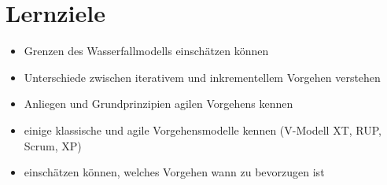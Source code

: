 \section{Lernziele}
\begin{itemize}
    \item Grenzen des Wasserfallmodells einschätzen können
    \item Unterschiede zwischen iterativem und inkrementellem Vorgehen verstehen
    \item Anliegen und Grundprinzipien agilen Vorgehens kennen
    \item einige klassische und agile Vorgehensmodelle kennen (V-Modell XT, RUP, Scrum, XP)
    \item einschätzen können, welches Vorgehen wann zu bevorzugen ist
\end{itemize}